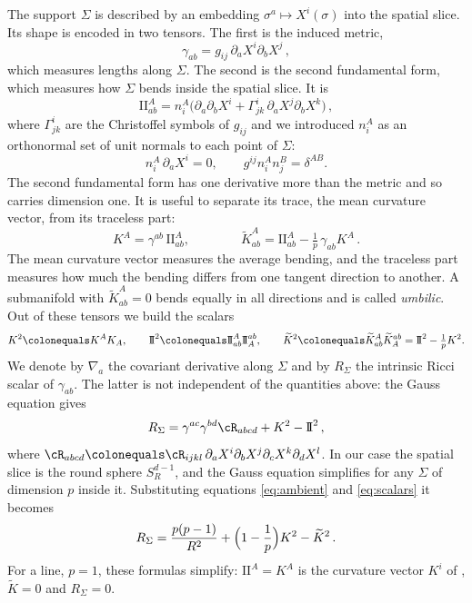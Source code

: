 \documentclass[a4paper,11pt]{article}
\newcommand{\II}{\mathrm{I\!I}}
\newcommand{\Kt}{\widetilde{K}}
\begin{document}
The support $\Sigma$ is described by an embedding $\sigma^a\mapsto X^i(\sigma)$ into the spatial slice. Its shape is encoded in two tensors. The first is the induced metric,
\begin{equation}
	\gamma_{ab}=g_{ij}\,\partial_aX^i\partial_bX^j\,  ,
\end{equation}
which measures lengths along $\Sigma$. The second is the second fundamental form, which measures how $\Sigma$ bends inside the spatial slice. It is 
\begin{equation}
	\II^A_{ab}=n^A_i\bigl(\partial_a\partial_bX^i+\Gamma^i_{jk}\,\partial_aX^j\partial_bX^k\bigr)\, ,
\end{equation}
where $\Gamma^i_{jk}$ are the Christoffel symbols of $g_{ij}$ and we introduced $n^A_i$ as an orthonormal set of unit normals to each point of $\Sigma$:
\begin{equation}
	n^A_i\,\partial_aX^i=0,\qquad g^{ij}n^A_in^B_j=\delta^{AB} .
\end{equation}
The second fundamental form has one derivative more than the metric and so carries dimension one. It is useful to separate its trace, the mean curvature vector, from its traceless part:
\begin{equation}
	K^A=\gamma^{ab}\,\II^A_{ab},\qquad\qquad \Kt^A_{ab}=\II^A_{ab}-\tfrac1p\,\gamma_{ab}K^A \, .
\end{equation}
The mean curvature vector measures the average bending, and the traceless part measures how much the bending differs from one tangent direction to another. A submanifold with $\Kt^A_{ab}=0$ bends equally in all directions and is called \emph{umbilic}. Out of these tensors we build the scalars
\begin{equation}\label{eq:scalars}
	K^2\colonequals K^AK_A,\qquad \II^2\colonequals\II^A_{ab}\II_A^{ab},\qquad \Kt^2\colonequals\Kt^A_{ab}\Kt_A^{ab}=\II^2-\tfrac1p K^2 .
\end{equation}
We denote by $\nabla_a$ the covariant derivative along $\Sigma$ and by $R_\Sigma$ the intrinsic Ricci scalar of $\gamma_{ab}$. The latter is not independent of the quantities above: the Gauss equation gives
\begin{equation}\label{eq:gauss}
	R_\Sigma=\gamma^{ac}\gamma^{bd}\cR_{abcd}+K^2-\II^2\, ,
\end{equation}
where $\cR_{abcd}\colonequals\cR_{ijkl}\,\partial_aX^i\partial_bX^j\partial_cX^k\partial_dX^l$. In our case the spatial slice is the round sphere $S^{d-1}_R$, and the Gauss equation simplifies for any $\Sigma$ of dimension $p$ inside it. Substituting equations \eqref{eq:ambient} and \eqref{eq:scalars} it becomes
\begin{equation}\label{eq:gausssphere}
R_\Sigma= \frac{p(p-1)}{R^2}+\Bigl(1-\frac1p\Bigr)K^2-\Kt^2\, .
\end{equation} 
For a line, $p=1$, these formulas simplify: $\II^A=K^A$ is the curvature vector $K^i$ of \cite{BMP}, $\Kt=0$ and $R_\Sigma=0$.
\end{document}
